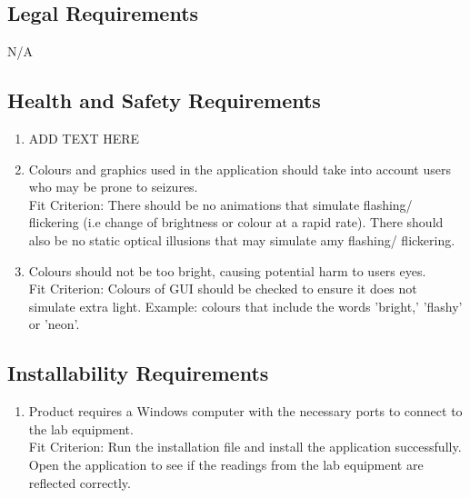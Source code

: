 \documentclass[12pt, titlepage]{article}
\begin{document}
\subsection{Legal Requirements}
\begin{adjustwidth}{2.7em}{0pt}
\begin{enumerate}[{NFR-LR}1.]
    N/A
\end{enumerate}
\end{adjustwidth}

\subsection{Health and Safety Requirements}
\begin{adjustwidth}{2.2em}{0pt}
\begin{enumerate}[{NFR-H}1.]
  \item ADD TEXT HERE
  \item Colours and graphics used in the application should take into account users who may be prone to seizures. \\
    Fit Criterion: There should be no animations that simulate flashing/ flickering (i.e change of brightness or colour at a rapid rate). There should also be no static optical illusions that may simulate amy flashing/ flickering.
    \item Colours should not be too bright, causing potential harm to users eyes. \\
    Fit Criterion: Colours of GUI should be checked to ensure it does not simulate extra light. Example: colours that include the words 'bright,' 'flashy' or 'neon'.
\end{enumerate}
\end{adjustwidth}

\subsection{Installability Requirements}
\begin{adjustwidth}{2.0em}{0pt}
\begin{enumerate}[{NFR-I}1.]
  \item Product requires a Windows computer with the necessary ports to connect to the lab equipment. \\
    Fit Criterion: Run the installation file and install the application successfully. Open the application to see if the readings from the lab equipment are reflected correctly.
\end{enumerate}
\end{adjustwidth}
\end{document}
